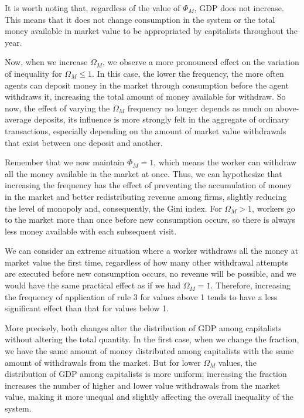 \documentclass[12pt,preprint]{revtex4-1}
\begin{document}
It is worth noting that, regardless of the value of $\Phi_M$, GDP does not increase. This means that it does not change consumption in the system or the total money available in market value to be appropriated by capitalists throughout the year. 

Now, when we increase $\Omega_M$, we observe a more pronounced effect on the variation of inequality for $\Omega_M\leq 1$. In this case, the lower the frequency, the more often agents can deposit money in the market through consumption before the agent withdraws it, increasing the total amount of money available for withdraw. 
%
So now, the effect of varying the $\Omega_M$ frequency no longer depends as much on above-average deposits, its influence is more strongly felt in the aggregate of ordinary transactions, especially depending on the amount of market value withdrawals that exist between one deposit and another.

Remember that we now maintain $\Phi_M=1$, which means the worker can withdraw all the money available in the market at once. Thus, we can hypothesize that increasing the frequency has the effect of preventing the accumulation of money in the market and better redistributing revenue among firms, slightly reducing the level of monopoly and, consequently, the Gini index. For $\Omega_M>1$, workers go to the market more than once before new consumption occurs, so there is always less money available with each subsequent visit.  

We can consider an extreme situation where a worker withdraws all the money at market value the first time, regardless of how many other withdrawal attempts are executed before new consumption occurs, no revenue will be possible, and we would have the same practical effect as if we had $\Omega_M=1$. Therefore, increasing the frequency of application of rule 3 for values above 1 tends to have a less significant effect than that for values below 1.
 
More precisely, both changes alter the distribution of GDP among capitalists without altering the total quantity. In the first case,  when we change the fraction, we have the same amount of money distributed among capitalists with the same amount of withdrawals from the market. But for lower $\Omega_M$ values, the distribution of GDP among capitalists is more uniform; increasing the fraction increases the number of higher and lower value withdrawals from the market value, making it more unequal and slightly affecting the overall inequality of the system. 
\end{document}
